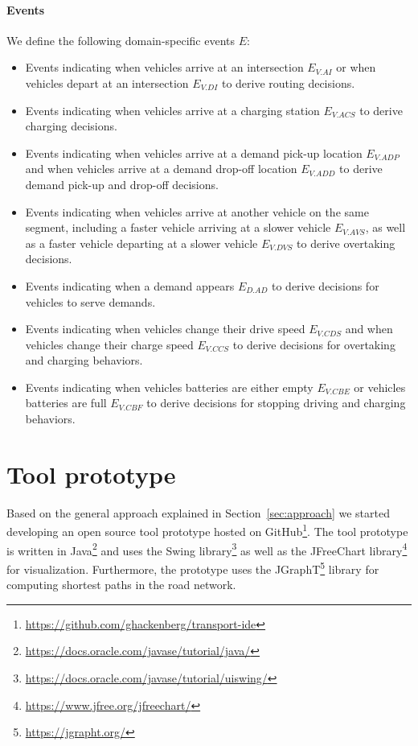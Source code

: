 \documentclass[a4paper,twoside]{article}
\begin{document}
	\paragraph{Events}
	We define the following domain-specific events $E$:
	\begin{itemize}
		\item Events indicating when vehicles arrive at an intersection $E_{V.AI}$ or when vehicles depart at an intersection $E_{V.DI}$ to derive routing decisions. 
		\item Events indicating when vehicles arrive at a charging station $E_{V.ACS}$ to derive charging decisions. 
		\item Events indicating when vehicles arrive at a demand pick-up location $E_{V.ADP}$ and when vehicles arrive at a demand drop-off location $E_{V.ADD}$ to derive demand pick-up and drop-off decisions. 
		\item Events indicating when vehicles arrive at another vehicle on the same segment, including a faster vehicle arriving at a  slower vehicle $E_{V.AVS}$, as well as a faster vehicle departing at a slower vehicle $E_{V.DVS}$ to derive overtaking decisions.
		\item Events indicating when a demand appears $E_{D.AD}$ to derive decisions for vehicles to serve demands.
		\item Events indicating when vehicles change their drive speed $E_{V.CDS}$ and when vehicles change their charge speed $E_{V.CCS}$ to derive decisions for overtaking and charging behaviors. 
		\item Events indicating when vehicles batteries are either empty $E_{V.CBE}$ or vehicles batteries are full $E_{V.CBF}$ to derive decisions for stopping driving and charging behaviors.
	\end{itemize}

	
	\section{Tool prototype}
	\label{sec:tool-prototype}
	
	Based on the general approach explained in Section~\ref{sec:approach} we started developing an open source tool prototype hosted on GitHub\footnote{\url{https://github.com/ghackenberg/transport-ide}}.
	The tool prototype is written in Java\footnote{\url{https://docs.oracle.com/javase/tutorial/java/}} and uses the Swing library\footnote{\url{https://docs.oracle.com/javase/tutorial/uiswing/}} as well as the JFreeChart library\footnote{\url{https://www.jfree.org/jfreechart/}} for visualization.
	Furthermore, the prototype uses the JGraphT\footnote{\url{https://jgrapht.org/}} library for computing shortest paths in the road network.
	
\end{document}
